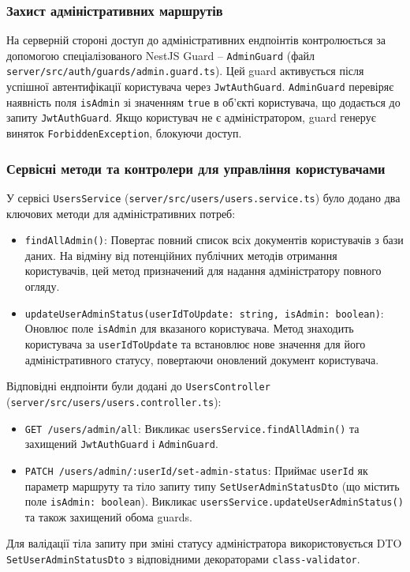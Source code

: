 \subsubsection{Захист адміністративних маршрутів}
На серверній стороні доступ до адміністративних ендпоінтів контролюється за допомогою спеціалізованого NestJS Guard – \texttt{AdminGuard} (файл \texttt{server/src/auth/guards/admin.guard.ts}). Цей guard активується після успішної автентифікації користувача через \texttt{JwtAuthGuard}. \texttt{AdminGuard} перевіряє наявність поля \texttt{isAdmin} зі значенням \texttt{true} в об'єкті користувача, що додається до запиту \texttt{JwtAuthGuard}. Якщо користувач не є адміністратором, guard генерує виняток \texttt{ForbiddenException}, блокуючи доступ.

\subsubsection{Сервісні методи та контролери для управління користувачами}
У сервісі \texttt{UsersService} (\texttt{server/src/users/users.service.ts}) було додано два ключових методи для адміністративних потреб:
\begin{itemize}
    \item \texttt{findAllAdmin()}: Повертає повний список всіх документів користувачів з бази даних. На відміну від потенційних публічних методів отримання користувачів, цей метод призначений для надання адміністратору повного огляду.
    \item \texttt{updateUserAdminStatus(userIdToUpdate: string, isAdmin: boolean)}: Оновлює поле \texttt{isAdmin} для вказаного користувача. Метод знаходить користувача за \texttt{userIdToUpdate} та встановлює нове значення для його адміністративного статусу, повертаючи оновлений документ користувача.
\end{itemize}
Відповідні ендпоінти були додані до \texttt{UsersController} (\texttt{server/src/users/users.controller.ts}):
\begin{itemize}
    \item \texttt{GET /users/admin/all}: Викликає \texttt{usersService.findAllAdmin()} та захищений \texttt{JwtAuthGuard} і \texttt{AdminGuard}.
    \item \texttt{PATCH /users/admin/:userId/set-admin-status}: Приймає \texttt{userId} як параметр маршруту та тіло запиту типу \texttt{SetUserAdminStatusDto} (що містить поле \texttt{isAdmin: boolean}). Викликає \texttt{usersService.updateUserAdminStatus()} та також захищений обома guards.
\end{itemize}
Для валідації тіла запиту при зміні статусу адміністратора використовується DTO \texttt{SetUserAdminStatusDto} з відповідними декораторами \texttt{class-validator}.

